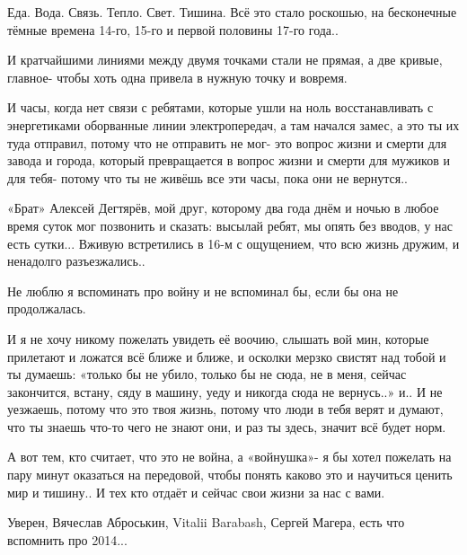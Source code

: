 Еда. Вода. Связь. Тепло. Свет. Тишина. Всё это стало роскошью, на бесконечные
тёмные времена 14-го, 15-го и первой половины 17-го года.. 

И кратчайшими линиями между двумя точками стали не прямая, а две кривые,
главное- чтобы хоть одна привела в нужную точку и вовремя. 

И часы, когда нет связи с ребятами, которые ушли на ноль восстанавливать с
энергетиками оборванные линии электропередач, а там начался замес, а это ты их
туда отправил, потому что не отправить не мог- это вопрос жизни и смерти для
завода и города, который превращается в вопрос жизни и смерти для мужиков и для
тебя- потому что ты не живёшь все эти часы, пока они не вернутся.. 

«Брат» Алексей Дегтярёв, мой друг, которому два года днём и ночью в любое время
суток мог позвонить и сказать: высылай ребят, мы опять без вводов, у нас есть
сутки... Вживую встретились в 16-м с ощущением, что всю жизнь дружим, и ненадолго
разъезжались..

\begin{multicols}{2}


\end{multicols}

Не люблю я вспоминать про войну и не вспоминал бы, если бы она не продолжалась. 

И я не хочу никому пожелать увидеть её воочию, слышать вой мин, которые
прилетают и ложатся всё ближе и ближе, и осколки мерзко свистят над тобой и ты
думаешь: «только бы не убило, только бы не сюда, не в меня, сейчас закончится,
встану, сяду в машину, уеду и никогда сюда не вернусь..» и.. И не уезжаешь,
потому что это твоя жизнь, потому что люди в тебя верят и думают, что ты знаешь
что-то чего не знают они, и раз ты здесь, значит всё будет норм.

А вот тем, кто считает, что это не война, а «войнушка»- я бы хотел пожелать на
пару минут оказаться на передовой, чтобы понять каково это и научиться ценить
мир и тишину.. И тех кто отдаёт и сейчас свои жизни за нас с вами.

Уверен, Вячеслав Аброськин, Vitalii Barabash, Сергей Магера, есть что вспомнить
про 2014...

